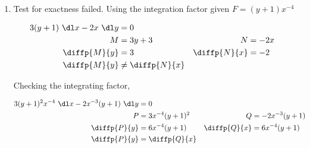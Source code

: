 \begin{enumerate}
          \begin{figure}[H]
              \centering
          \end{figure}

    \item Test for exactness failed. Using the integration factor given $ F = (y + 1)x^{-4} $

          \begin{align}
              3(y + 1)\ \dl x - 2x\ \dl y & = 0                                      \\
              M                           & = 3y + 3          & N            & = -2x \\
              \diffp{M}{y}                & = 3               & \diffp{N}{x} & = -2  \\
              \diffp{M}{y}                & \neq \diffp{N}{x}
          \end{align}

          Checking the integrating factor,

          \begin{align}
              3(y + 1)^{2}x^{-4}\ \dl x - 2x^{-3}(y+1)\ \dl y & = 0                                                 \\
              P                                               & = 3x^{-4}(y+1)^{2} & Q            & = -2x^{-3}(y+1) \\
              \diffp{P}{y}                                    & = 6x^{-4}(y+1)     & \diffp{Q}{x} & = 6x^{-4}(y+1)  \\
              \diffp{P}{y}                                    & = \diffp{Q}{x}
          \end{align}



\end{enumerate}
